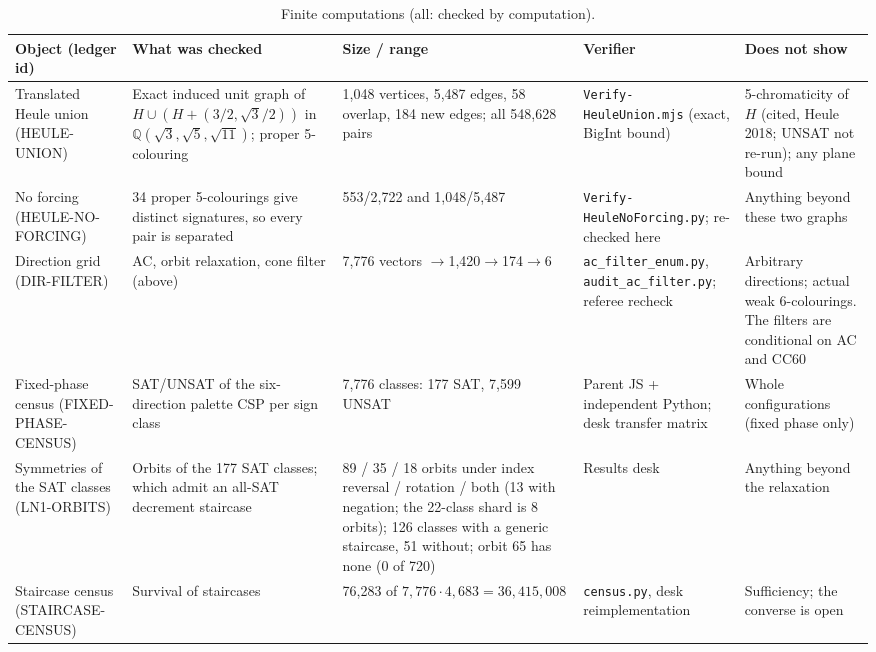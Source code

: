 \documentclass[11pt]{article}
\theoremstyle{definition}
\theoremstyle{remark}
\begin{document}
\begin{table}[ht]
\centering\scriptsize\setlength{\tabcolsep}{3pt}
\caption{Finite computations (all: checked by computation).}\label{tab:finite}
\begin{tabular}{P{0.15\textwidth}P{0.25\textwidth}P{0.15\textwidth}P{0.14\textwidth}P{0.21\textwidth}}
\hline
Object (ledger id) & What was checked & Size / range & Verifier & Does not show \\
\hline
Translated Heule union (HEULE-UNION) & Exact induced unit graph of $H\cup(H+(3/2,\sqrt3/2))$ in $\mathbb{Q}(\sqrt3,\allowbreak\sqrt5,\allowbreak\sqrt{11})$; proper 5-colouring & 1{,}048 vertices, 5{,}487 edges, 58 overlap, 184 new edges; all 548{,}628 pairs & \texttt{Verify-\allowbreak{}Heule\allowbreak{}Union\allowbreak{}.\allowbreak{}mjs} (exact, BigInt bound) & 5-chromaticity of $H$ (cited, Heule 2018; UNSAT not re-run); any plane bound \\
No forcing (HEULE-NO-FORCING) & 34 proper 5-colourings give distinct signatures, so every pair is separated & 553/2{,}722 and 1{,}048/5{,}487 & \texttt{Verify-\allowbreak{}Heule\allowbreak{}No\allowbreak{}Forcing\allowbreak{}.\allowbreak{}py}; re-checked here & Anything beyond these two graphs \\
Direction grid (DIR-FILTER) & AC, orbit relaxation, cone filter (above) & 7{,}776 vectors $\to$1{,}420$\to$174$\to$6 & \texttt{ac\_\allowbreak{}filter\_\allowbreak{}enum.\allowbreak{}py}, \texttt{audit\_\allowbreak{}ac\_\allowbreak{}filter.\allowbreak{}py}; referee recheck & Arbitrary directions; actual weak 6-colourings. The filters are conditional on AC and CC60 \\
Fixed-phase census (FIXED-PHASE-CENSUS) & SAT/UNSAT of the six-direction palette CSP per sign class & 7{,}776 classes: 177 SAT, 7{,}599 UNSAT & Parent JS + independent Python; desk transfer matrix & Whole configurations (fixed phase only) \\
Symmetries of the SAT classes (LN1-ORBITS) & Orbits of the 177 SAT classes; which admit an all-SAT decrement staircase & 89 / 35 / 18 orbits under index reversal / rotation / both (13 with negation; the 22-class shard is 8 orbits); 126 classes with a generic staircase, 51 without; orbit 65 has none (0 of 720) & Results desk & Anything beyond the relaxation \\
Staircase census (STAIRCASE-CENSUS) & Survival of staircases & 76{,}283 of $7{,}776\cdot4{,}683=36{,}415{,}008$ & \texttt{census.py}, desk reimplementation & Sufficiency; the converse is open \\

\end{tabular}
\end{table}
\end{document}
